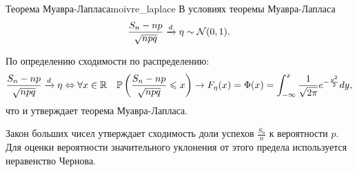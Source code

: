 \begin{corollary}{Теорема Муавра-Лапласа}{moivre_laplace}
    В условиях теоремы Муавра-Лапласа
    \begin{align*}
        \frac{S_n - np}{\sqrt{npq}} \xrightarrow{d} \eta \sim \mathcal{N}(0, 1).
    \end{align*}
\end{corollary}

\begin{proofbox}
    По определению сходимости по распределению:
    \begin{align*}
        \frac{S_n - np}{\sqrt{npq}} \xrightarrow{d} \eta \Leftrightarrow \forall x \in \mathbb{R} \quad \mathbb{P}\left( \frac{S_n - np}{\sqrt{npq}} \leqslant x \right) \to F_\eta(x) = \Phi(x) = \int_{-\infty}^x \frac{1}{\sqrt{2\pi}} e^{-\frac{y^2}{2}} dy,
    \end{align*}
    что и утверждает теорема Муавра-Лапласа.
\end{proofbox}

\vspace{1em}
Закон больших чисел утверждает сходимость доли успехов $\frac{S_n}{n}$ к вероятности $p$. Для оценки вероятности значительного уклонения от этого предела используется неравенство Чернова.


